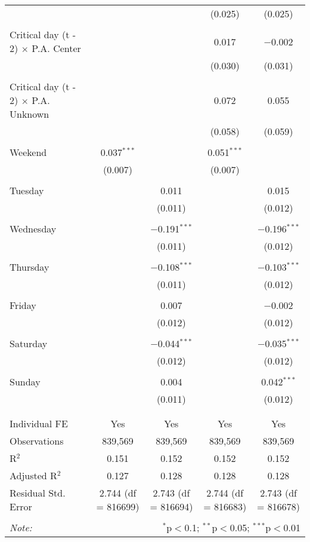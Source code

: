 \documentclass[
]{article}
\begin{document}
\begin{table}[!htbp]
{\begin{tabular}{@{\extracolsep{5pt}}lcccc}
  &  &  & (0.025) & (0.025) \\ 
  & & & & \\ 
 Critical day (t - 2) $\times$ P.A. Center &  &  & 0.017 & $-$0.002 \\ 
  &  &  & (0.030) & (0.031) \\ 
  & & & & \\ 
 Critical day (t - 2) $\times$ P.A. Unknown &  &  & 0.072 & 0.055 \\ 
  &  &  & (0.058) & (0.059) \\ 
  & & & & \\ 
 Weekend & 0.037$^{***}$ &  & 0.051$^{***}$ &  \\ 
  & (0.007) &  & (0.007) &  \\ 
  & & & & \\ 
 Tuesday &  & 0.011 &  & 0.015 \\ 
  &  & (0.011) &  & (0.012) \\ 
  & & & & \\ 
 Wednesday &  & $-$0.191$^{***}$ &  & $-$0.196$^{***}$ \\ 
  &  & (0.011) &  & (0.012) \\ 
  & & & & \\ 
 Thursday &  & $-$0.108$^{***}$ &  & $-$0.103$^{***}$ \\ 
  &  & (0.011) &  & (0.012) \\ 
  & & & & \\ 
 Friday &  & 0.007 &  & $-$0.002 \\ 
  &  & (0.012) &  & (0.012) \\ 
  & & & & \\ 
 Saturday &  & $-$0.044$^{***}$ &  & $-$0.035$^{***}$ \\ 
  &  & (0.012) &  & (0.012) \\ 
  & & & & \\ 
 Sunday &  & 0.004 &  & 0.042$^{***}$ \\ 
  &  & (0.011) &  & (0.012) \\ 
  & & & & \\ 
\hline \\[-1.8ex] 
Individual FE & Yes & Yes & Yes & Yes \\ 
Observations & 839,569 & 839,569 & 839,569 & 839,569 \\ 
R$^{2}$ & 0.151 & 0.152 & 0.152 & 0.152 \\ 
Adjusted R$^{2}$ & 0.127 & 0.128 & 0.128 & 0.128 \\ 
Residual Std. Error & 2.744 (df = 816699) & 2.743 (df = 816694) & 2.744 (df = 816683) & 2.743 (df = 816678) \\ 
\hline 
\hline \\[-1.8ex] 
\textit{Note:}  & \multicolumn{4}{r}{$^{*}$p$<$0.1; $^{**}$p$<$0.05; $^{***}$p$<$0.01} \\ 
\end{tabular}
} 
\end{table}
\end{document}
